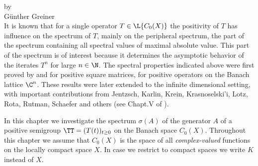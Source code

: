 \label{chap:b3}%
\thispagestyle{empty}
{\Large
\vspace*{-.75cm}
by \\[.25em]
Günther Greiner
\vspace{.75cm}
\\
}
It is known that for a single operator $T \in \L{C_{0}(X)}$ the positivity of\/ $T$ has influence on the spectrum of\/ $T$, mainly on the peripheral spectrum, \ie the part of the spectrum containing all spectral values of maximal absolute value.
This part of the spectrum is of interest because it determines the asymptotic behavior of the iterates $T^{n}$ for large $n \in \N$.
The spectral properties indicated above were first proved by \textcite{perron:1907} and \textcite{frobenius:1909} for positive square matrices, \ie for positive operators on the Banach lattice $\C^{n}$.
These results were later extended to the infinite dimensional setting, with important contributions from Jentzsch, Karlin, Krein, Krasnoselski'i, Lotz, Rota, Rutman, Schaefer and others (see Chapt.V of \textcite{schaefer:1974}).

In this chapter we investigate the spectrum $\sigma(A)$ of the generator $A$ of a positive semigroup $\TT = (T(t))_{t \geq 0}$ on the Banach space $C_{0}(X)$.
Throughout this chapter we assume that $C_{0}(X)$ is the space of all \emph{complex-valued} functions on the locally compact space $X$.
In case we restrict to compact spaces we write $K$ instead of\/ $X$.
